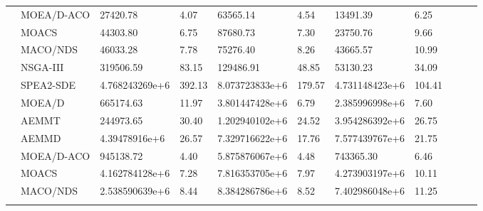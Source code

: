 \begin{sidewaystable}[]
\begin{tabular}{clV{5}l|lV{5}l|lV{5}l|l|}
		 & MOEA/D-ACO & 27420.78 & 4.07 & 63565.14 & 4.54 & 13491.39 & 6.25\\ 
		 & MOACS & 44303.80 & 6.75 & 87680.73 & 7.30 & 23750.76 & 9.66\\ 
		 & MACO/NDS & 46033.28 & 7.78 & 75276.40 & 8.26 & 43665.57 & 10.99\\ 
		 & NSGA-III & 319506.59 & 83.15 & 129486.91 & 48.85 & 53130.23 & 34.09\\ 
		 & SPEA2-SDE & 4.768243269e+6 & 392.13 & 8.073723833e+6 & 179.57 & 4.731148423e+6 & 104.41\\ 
		 & MOEA/D & 665174.63 & 11.97 & 3.801447428e+6 & 6.79 & 2.385996998e+6 & 7.60\\ 
		 & AEMMT & 244973.65 & 30.40 & 1.202940102e+6 & 24.52 & 3.954286392e+6 & 26.75\\ 
		 & AEMMD & 4.39478916e+6 & 26.57 & 7.329716622e+6 & 17.76 & 7.577439767e+6 & 21.75\\ 
		 & MOEA/D-ACO & 945138.72 & 4.40 & 5.875876067e+6 & 4.48 & 743365.30 & 6.46\\ 
		 & MOACS & 4.162784128e+6 & 7.28 & 7.816353705e+6 & 7.97 & 4.273903197e+6 & 10.11\\ 
		 & MACO/NDS & 2.538590639e+6 & 8.44 & 8.384286786e+6 & 8.52 & 7.402986048e+6 & 11.25\\ 
	\end{tabular}
\end{sidewaystable}



